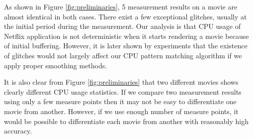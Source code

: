 As shown in Figure \ref{fig:preliminaries}, 5 measurement results on a movie are almost identical in both cases. 
There exist a few exceptional glitches, usually at the initial period during the measurement. 
Our analysis is that CPU usage of Netflix application is not deterministic when it starts rendering a movie because of initial buffering.
However, it is later shown by experiments that the existence of glitches would not largely affect our CPU pattern matching algorithm if we apply proper smoothing methods. 

It is also clear from Figure \ref{fig:preliminaries} that two different movies shows clearly different CPU usage statistics. 
If we compare two measurement results using only a few measure points then it may not be easy to differentiate one movie from another.
However, if we use enough number of measure points, it would be possible to differentiate each movie from another with reasonably high accuracy. 

 

